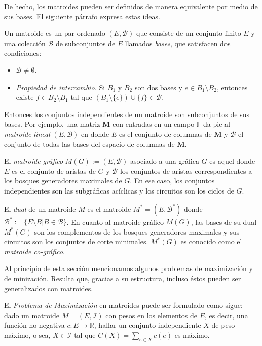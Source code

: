 De hecho, los matroides pueden ser definidos de manera equivalente por medio de sus bases. El siguiente párrafo expresa estas ideas.

Un matroide es un par ordenado $(E, \mathcal{B})$ que consiste de un conjunto finito $E$ y una colección $\mathcal{B}$ de subconjuntos de $E$ llamados \textit{bases}, que satisfacen dos condiciones:
\begin{itemize}
    \item $\mathcal{B} \neq \emptyset$.
    \item \textit{Propiedad de intercambio.} Si $B_{1}$ y $B_{2}$ son dos bases y $e \in B_{1}\setminus B_{2}$, entonces existe $f \in B_{2}\setminus B_{1}$ tal que $(B_{1} \setminus \{e\})\cup \{f\} \in \mathcal{B}$.
\end{itemize}

Entonces los conjuntos independientes de un matroide son subconjuntos de sus bases. Por ejemplo, una matriz $\mathbf{M}$ con entradas en un campo $\mathbb{F}$ da pie al \textit{matroide lineal} $(E, \mathcal{B})$ en donde $E$ es el conjunto de columnas de $\mathbf{M}$ y $\mathcal{B}$ el conjunto de todas las bases del espacio de columnas de $\mathbf{M}$.

El \textit{matroide gráfico} $M(G):= (E, \mathcal{B})$ asociado a una gráfica $G$ es aquel donde $E$ es el conjunto de aristas de $G$ y $\mathcal{B}$ los conjuntos de aristas correspondientes a los bosques generadores maximales de $G$. En ese caso, los conjuntos independientes son las subgráficas acíclicas y los circuitos son los ciclos de $G$.

El \textit{dual} de un matroide $M$ es el matroide $M^{*} = (E,\mathcal{B}^{*})$ donde $\mathcal{B}^{*}:=\{E\setminus B | B \in \mathcal{B}\}$. En cuanto al matroide gráfico $M(G)$, las bases de su dual $M^{*}(G)$ son los complementos de los bosques generadores maximales y sus circuitos son los conjuntos de corte minimales. $M^{*}(G)$ es conocido como el \textit{matroide co-gráfico}.

Al principio de esta sección mencionamos algunos problemas de maximización y de minización. Resulta que, gracias a su estructura, incluso éstos pueden ser generalizados con matroides.

El \textit{Problema de Maximización} en matroides puede ser formulado como sigue: dado un matroide $M=(E,\mathcal{I})$ con pesos en los elementos de $E$, es decir, una función no negativa $c \colon E \rightarrow \mathbb{R}$, hallar un conjunto independiente $X$ de peso máximo, o sea, $X\in \mathcal{I}$ tal que $C(X) = \sum_{e \in X}c(e)$ es máximo.

